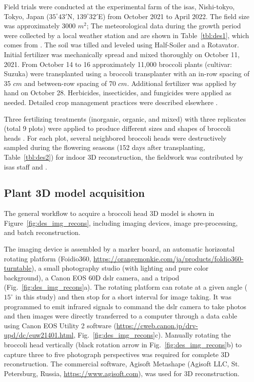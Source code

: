Field trials were conducted at the experimental farm of the \gls{isas}, Nishi-tokyo, Tokyo, Japan ($35^\circ 43'$N, $139^\circ 32'$E) from October 2021 to April 2022. The field size was approximately 3000 $m^2$; The meteorological data during the growth period were collected by a local weather station and are shown in Table~\ref{tbl:des1}, which comes from \mbox{\citet{nishida_estimation_2023}}. The soil was tilled and leveled using Half-Soiler and a Rotavator. Initial fertilizer was mechanically spread and mixed thoroughly on October 11, 2021. From October 14 to 16 approximately 11,000 broccoli plants (cultivar: Suzuka) were transplanted using a broccoli transplanter with an in-row spacing of 35 $cm$ and between-row spacing of 70 $cm$. Additional fertilizer was applied by hand on October 28. Herbicides, insecticides, and fungicides were applied as needed. Detailed crop management practices were described elsewhere \citep{nishida_estimation_2023}.



Three fertilizing treatments (inorganic, organic, and mixed) with three replicates (total 9 plots) were applied to produce different sizes and shapes of broccoli heads \citep{nishida_estimation_2023}. For each plot, several neighbored broccoli heads were destructively sampled during the flowering seasons (152 days after transplanting, Table~\ref{tbl:des2}) for indoor 3D reconstruction, the fieldwork was contributed by \gls{isas} staff and \mbox{\citet{nishida_estimation_2023}}.



\subsection{Plant 3D model acquisition}\label{sec:3ddb}

The general workflow to acquire a broccoli head 3D model is shown in Figure~\ref{fig:des_img_recons}, including imaging devices, image pre-processing, and batch reconstruction.



The imaging device is assembled by a marker board, an automatic horizontal rotating platform (Foidio360, \url{https://orangemonkie.com/ja/products/foldio360-turntable}), a small photography studio (with lighting and pure color background), a Canon EOS 60D \gls{dslr} camera, and a tripod (Fig.~\ref{fig:des_img_recons}a). The rotating platform can rotate at a given angle ($15^\circ$ in this study) and then stop for a short interval for image taking. It was programmed to emit infrared signals to command the \gls{dslr} camera to take photos and then images were directly transferred to a computer through a data cable using Canon EOS Utility 2 software (\url{https://cweb.canon.jp/drv-upd/dc/euw21401.html}, Fig.~\ref{fig:des_img_recons}c). Manually rotating the broccoli head vertically (black rotation arrow in Fig.~\ref{fig:des_img_recons}b) to capture three to five photograph perspectives was required for complete 3D reconstruction. The commercial software, Agisoft Metashape (Agisoft LLC, St. Petersburg, Russia, \url{https://www.agisoft.com}), was used for 3D reconstruction.

